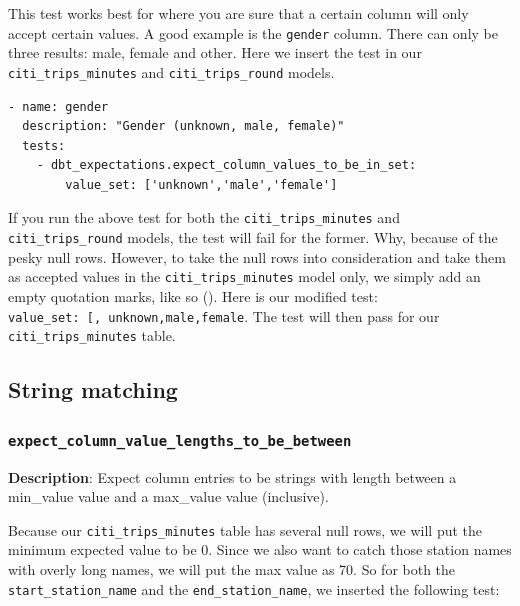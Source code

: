 \documentclass[
]{book}
\begin{document}
This test works best for where you are sure that a certain column will only accept certain values. A good example is the \texttt{gender} column. There can only be three results: male, female and other. Here we insert the test in our \texttt{citi\_trips\_minutes} and \texttt{citi\_trips\_round} models.

\begin{verbatim}
- name: gender
  description: "Gender (unknown, male, female)"
  tests:
    - dbt_expectations.expect_column_values_to_be_in_set:
        value_set: ['unknown','male','female']
\end{verbatim}

If you run the above test for both the \texttt{citi\_trips\_minutes} and \texttt{citi\_trips\_round} models, the test will fail for the former. Why, because of the pesky null rows. However, to take the null rows into consideration and take them as accepted values in the \texttt{citi\_trips\_minutes} model only, we simply add an empty quotation marks, like so (\texttt{\textquotesingle{}\textquotesingle{}}). Here is our modified test: \texttt{value\_set:\ {[}\textquotesingle{}\textquotesingle{},\ \textquotesingle{}unknown\textquotesingle{},\textquotesingle{}male\textquotesingle{},\textquotesingle{}female\textquotesingle{}{]}}. The test will then pass for our \texttt{citi\_trips\_minutes} table.

\hypertarget{string-matching}{%
\subsection{String matching}\label{string-matching}}

\hypertarget{expect_column_value_lengths_to_be_between}{%
\subsubsection{\texorpdfstring{\texttt{expect\_column\_value\_lengths\_to\_be\_between}}{expect\_column\_value\_lengths\_to\_be\_between}}\label{expect_column_value_lengths_to_be_between}}

\textbf{Description}: Expect column entries to be strings with length between a min\_value value and a max\_value value (inclusive).

Because our \texttt{citi\_trips\_minutes} table has several null rows, we will put the minimum expected value to be 0. Since we also want to catch those station names with overly long names, we will put the max value as 70. So for both the \texttt{start\_station\_name} and the \texttt{end\_station\_name}, we inserted the following test:
\end{document}
